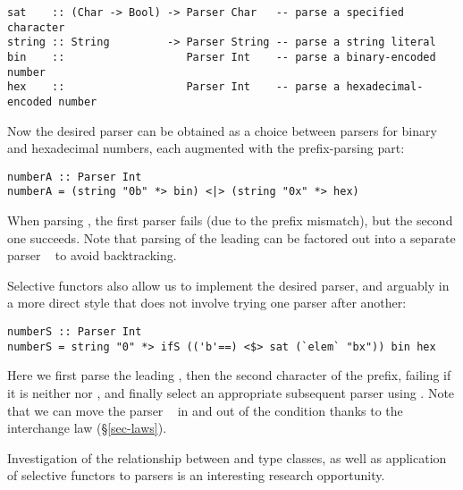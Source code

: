 \vspace{1mm}
\begin{verbatim}
sat    :: (Char -> Bool) -> Parser Char   -- parse a specified character
string :: String         -> Parser String -- parse a string literal
bin    ::                   Parser Int    -- parse a binary-encoded number
hex    ::                   Parser Int    -- parse a hexadecimal-encoded number
\end{verbatim}
\vspace{1mm}

\noindent
Now the desired parser can be obtained as a choice between parsers for binary
and hexadecimal numbers, each augmented with the prefix-parsing part:

\vspace{1mm}
\begin{verbatim}
numberA :: Parser Int
numberA = (string "0b" *> bin) <|> (string "0x" *> hex)
\end{verbatim}
\vspace{1mm}

\noindent
When parsing , the first parser fails (due to the prefix mismatch),
but the second one succeeds. Note that parsing of the leading  can be
factored out into a separate parser ~ to avoid backtracking.

Selective functors also allow us to implement the desired parser, and arguably
in a more direct style that does not involve trying one parser after another:

\vspace{1mm}
\begin{verbatim}
numberS :: Parser Int
numberS = string "0" *> ifS (('b'==) <$> sat (`elem` "bx")) bin hex
\end{verbatim}
\vspace{1mm}

\noindent
Here we first parse the leading , then the second character of the
prefix, failing if it is neither  nor , and finally select an
appropriate subsequent parser using . Note that we can move the parser
~ in and out of the condition  thanks to the
interchange law (\S\ref{sec-laws}).

Investigation of the relationship between  and 
type classes, as well as application of selective functors to parsers is an
interesting research opportunity.
